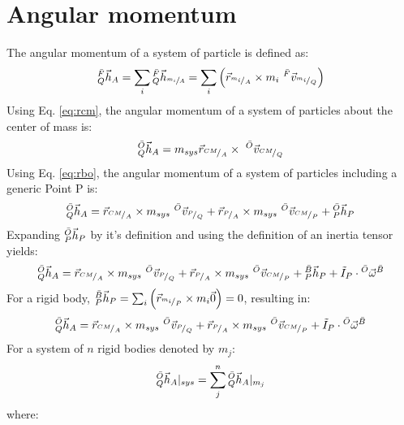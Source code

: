 \documentclass{article}
\begin{document}
\section{Angular momentum}
\label{sec:angmom}
The angular momentum of a system of particle is defined as:
\begin{equation}
    \AngMom{F}{Q}{A} = \sum_{i} \AngMom{F}{Q}{\sfrac{m_i}{A}} = \sum_{i} \Big( \Cross{\PosVec{m_i}{A}}{m_i\VelVec{F}{m_i}{Q}} \Big)
    \label{eq:angmom}
\end{equation}
Using Eq. \ref{eq:rcm}, the angular momentum of a system of particles about the center of mass is:
\begin{equation}
    \AngMom{O}{Q}{A} = m_{sys} \Cross{\PosVec{CM}{A}}{\VelVec{O}{CM}{Q}}
    \label{eq:ohqa1}
\end{equation}
Using Eq. \ref{eq:rbo}, the angular momentum of a system of particles including a generic Point P is:
\begin{equation}
    \AngMom{O}{Q}{A} = \Cross{\PosVec{CM}{A}}{m_{sys}\VelVec{O}{P}{Q}} + \Cross{\PosVec{P}{A}}{m_{sys}\VelVec{O}{CM}{P}} + \AngMom{O}{P}{P} 
    \label{eq:ohqa2}
\end{equation}
Expanding $\AngMom{O}{P}{P}$ by it's definition and using the definition of an inertia tensor yields:
\begin{equation}
    \AngMom{O}{Q}{A} = \Cross{\PosVec{CM}{A}}{m_{sys}\VelVec{O}{P}{Q}} + \Cross{\PosVec{P}{A}}{m_{sys}\VelVec{O}{CM}{P}} + \AngMom{B}{P}{P} + \Inert{P}\cdot\AngVel{O}{B}
    \label{eq:ohqa3}
\end{equation}
For a rigid body, $\AngMom{B}{P}{P} = \sum_{i} \Big( \Cross{\PosVec{m_i}{P}}{m_i\vec{0}} \Big) = 0$, resulting in:
\begin{equation}
    \AngMom{O}{Q}{A} = \Cross{\PosVec{CM}{A}}{m_{sys}\VelVec{O}{P}{Q}} + \Cross{\PosVec{P}{A}}{m_{sys}\VelVec{O}{CM}{P}} + \Inert{P}\cdot\AngVel{O}{B}
    \label{eq:ohqa4}
\end{equation}
For a system of $n$ rigid bodies denoted by $m_j$:  
\begin{equation}
    \AngMom{O}{Q}{A}\vert_{sys} = \sum_{j}^{n} \AngMom{O}{Q}{A}\vert_{m_j}
    \label{eq:ohqa5}
\end{equation}
where:
\end{document}
